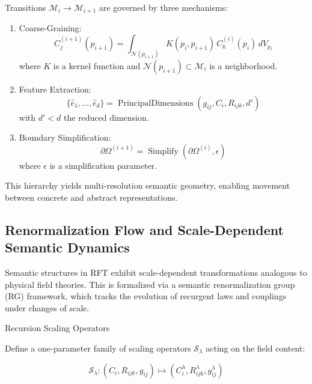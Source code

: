 Transitions \(\mathcal{M}_i \to \mathcal{M}_{i+1}\) are governed by three mechanisms:

\begin{enumerate}
    \item Coarse-Graining:
    \begin{equation}
    C^{(i+1)}_j(p_{i+1}) = \int_{\mathcal{N}(p_{i+1})} K(p_i, p_{i+1}) \, C^{(i)}_k(p_i) \, dV_{p_i}
    \end{equation}
    where \(K\) is a kernel function and \(\mathcal{N}(p_{i+1}) \subset \mathcal{M}_i\) is a neighborhood.

    \item Feature Extraction:
    \begin{equation}
    \{\hat{e}_1, \ldots, \hat{e}_d\} = \operatorname{PrincipalDimensions}(g_{ij}, C_i, R_{ijk}, d')
    \end{equation}
    with \(d' < d\) the reduced dimension.

    \item Boundary Simplification:
    \begin{equation}
    \partial \Omega^{(i+1)} = \operatorname{Simplify}(\partial \Omega^{(i)}, \epsilon)
    \end{equation}
    where \(\epsilon\) is a simplification parameter.
\end{enumerate}

This hierarchy yields multi-resolution semantic geometry, enabling movement between concrete and abstract representations.

\subsection{Renormalization Flow and Scale-Dependent Semantic Dynamics}

Semantic structures in RFT exhibit scale-dependent transformations analogous to physical field theories. This is formalized via a semantic renormalization group (RG) framework, which tracks the evolution of recurgent laws and couplings under changes of scale.

Recursion Scaling Operators

Define a one-parameter family of scaling operators \(\mathcal{S}_\lambda\) acting on the field content:

\begin{equation}
\mathcal{S}_\lambda: (C_i, R_{ijk}, g_{ij}) \mapsto (C_i^\lambda, R_{ijk}^\lambda, g_{ij}^\lambda)
\end{equation}


